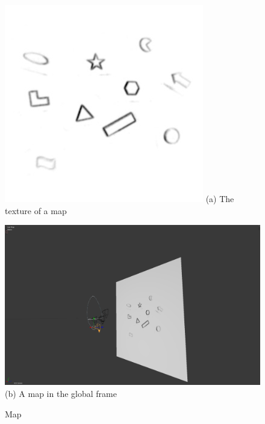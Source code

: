 \begin{figure}
  \begin{minipage}[t]{0.48\textwidth}
    \centering \includegraphics[width =
    \textwidth]{images/map_805.jpg}
    (a) The texture of a map
  \end{minipage}
  \hfill
  \begin{minipage}[t]{0.48\textwidth}
    \centering \includegraphics[width = \textwidth]{images/4.png}
    (b) A map in the global frame
  \end{minipage}
  \caption{Map}
  \label{fig:map}
\end{figure}




